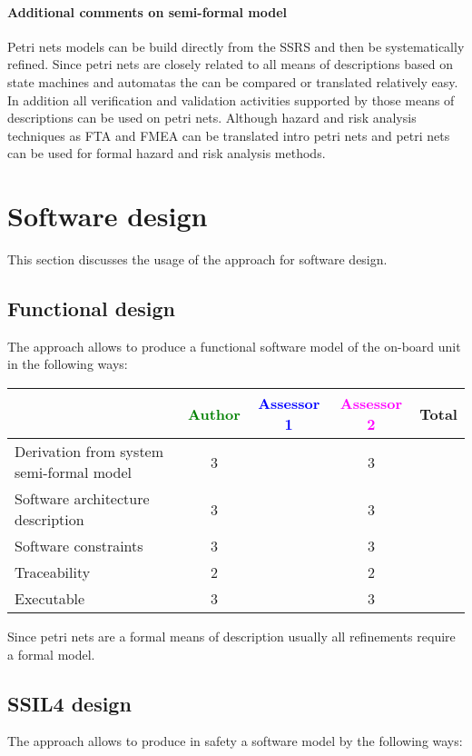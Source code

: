\paragraph{Additional comments on semi-formal  model} 
Petri nets models can be build directly from the SSRS and then be systematically refined. 
Since petri nets are closely related to all means of descriptions based on state machines and automatas the can be compared or translated relatively easy. In addition all verification and validation activities supported by those means of descriptions can be used on petri nets. Although hazard and risk analysis techniques as FTA and FMEA can be translated intro petri nets and petri nets can be used for formal hazard and risk analysis methods.


\section{Software design}
This section discusses the usage of the approach for software design.

\subsection{Functional design}

The approach allows to  produce a functional software model of the on-board unit in the following ways:

\begin{tabular}{|l | c | c | c | c|}
\hline
& \textcolor{green}{Author} & \textcolor{blue}{Assessor 1} & \textcolor{magenta}{Assessor 2} & Total \\
\hline
Derivation from system semi-formal model  & 3 & & 3 &  \\
\hline 
Software architecture description  & 3 & & 3 &  \\
\hline
Software constraints  & 3 & & 3 &  \\
\hline
Traceability  & 2 & & 2 &  \\
\hline
Executable  & 3 & & 3 &  \\
\hline
\end{tabular}
Since petri nets are a formal means of description usually all refinements require a formal model.

\subsection{SSIL4 design}

The approach allows to  produce in safety a software model by the following ways:

